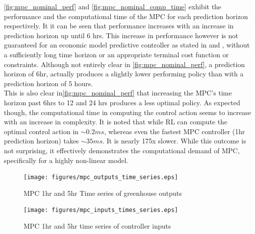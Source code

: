 \autoref{fig:mpc_nominal_perf} and \autoref{fig:mpc_nominal_comp_time} exhibit the performance and the computational time of the MPC for each prediction horizon respectively. It it can be seen that performance increases with an increase in prediction horizon up until 6 hrs. This increase in performance however is not guaranteed for an economic model predictive controller as stated in \cite{ellisTutorialReviewEconomic2014}  and \cite{amritEconomicOptimizationUsing2011}, without a sufficiently long time horizon or an appropriate terminal cost function or constraints. Although not entirely clear in \autoref{fig:mpc_nominal_perf}, a prediction horizon of 6hr, actually produces a slightly lower performing policy than with a prediction horizon of 5 hours. \\
This is also clear in\autoref{fig:mpc_nominal_perf} that increasing the MPC's time horizon past 6hrs to 12 and 24 hrs produces a less optimal policy. As expected though, the computational time in computing the control action seems to increase with an increase in complexity. It is noted that while RL can compute the optimal control action in $ \sim 0.2 ms$, whereas even the fastest MPC controller (1hr prediction horizon) takes $\sim 35 ms$. It is nearly 175x slower.  While this outcome is not surprising, it effectively demonstrates the computational demand of MPC, specifically for a highly non-linear model.

\begin{figure}[H]
	\centering
	\texttt{[image: figures/mpc\_outputs\_time\_series.eps]}
	\caption{MPC 1hr and 5hr Time series of greenhouse outputs}
	\label{fig:mpc-timeseries-outputs}
\end{figure}

\begin{figure}[H]
	\centering
	\texttt{[image: figures/mpc\_inputs\_times\_series.eps]}
	\caption{MPC 1hr and 5hr time series of controller inputs}
	\label{fig:mpc-timeseries-inputs}
\end{figure}

